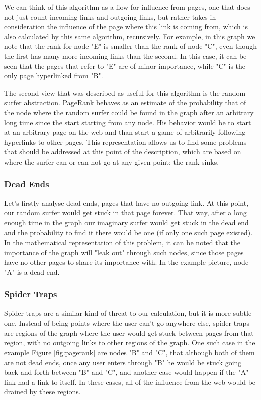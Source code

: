 We can think of this algorithm as a flow for influence from pages, one that does not just count incoming links and outgoing links, but rather takes in consideration the influence of the page where this link is coming from, which is also calculated by this same algorithm, recursively. For example, in this graph we note that the rank for node "E" is smaller than the rank of node "C", even though the first has many more incoming links than the second. In this case, it can be seen that the pages that refer to "E" are of minor importance, while "C" is the only page hyperlinked from "B".

The second view that was described as useful for this algorithm is the random surfer abstraction. PageRank behaves as an estimate of the probability that of the node where the random surfer could be found in the graph after an arbitrary long time since the start starting from any node. His behavior would be to start at an arbitrary page on the web and than start a game of arbitrarily following hyperlinks to other pages. This representation allows us to find some problems that should be addressed at this point of the description, which are based on where the surfer can or can not go at any given point: the rank sinks.

\subsubsection{Dead Ends}
Let's firstly analyse dead ends, pages that have no outgoing link. At this point, our random surfer would get stuck in that page forever. That way, after a long enough time in the graph our imaginary surfer would get stuck in the dead end and the probability to find it there would be one (if only one such page existed). In the mathematical representation of this problem, it can be noted that the importance of the graph will "leak out" through such nodes, since those pages have no other pages to share its importance with. In the example picture, node "A" is a dead end.

\subsubsection{Spider Traps}
Spider traps are a similar kind of threat to our calculation, but it is more subtle one. Instead of being points where the user can't go anywhere else, spider traps are regions of the graph where the user would get stuck between pages from that region, with no outgoing links to other regions of the graph. One such case in the example Figure \ref{fig:pagerank} are nodes "B" and "C", that although both of them are not dead ends, once any user enters through "B" he would be stuck going back and forth between "B" and "C", and another case would happen if the "A" link had a link to itself. In these cases, all of the influence from the web would be drained by these regions.

